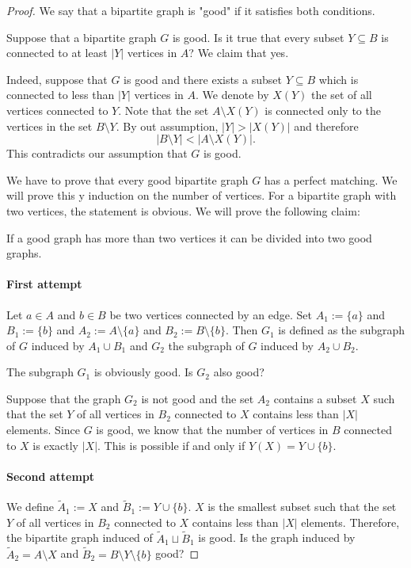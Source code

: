 \begin{proof}
We say that a bipartite graph is "good" if it satisfies both conditions. 

Suppose that a bipartite graph $G$ is good. Is it true that every subset $Y\subseteq B$ is connected to at least $|Y|$ vertices in $A$? We claim that yes.

Indeed, suppose that $G$ is good and there exists a subset $Y\subseteq B$ which is connected to less than $|Y|$ vertices in $A$. We denote by $X(Y)$ the set of all vertices connected to $Y$. Note that the set $A\setminus X(Y)$ is connected only to the vertices in the set $B\setminus Y$. By out assumption, $|Y|>|X(Y)|$ and therefore
$$
|B\setminus Y|<|A\setminus X(Y)|.
$$
This contradicts our assumption that $G$ is good.

We have to prove that every good bipartite graph $G$ has a perfect matching. We will prove this y induction on the number of vertices. For a bipartite graph with two vertices, the statement is obvious. We will prove the following claim:
\begin{claim}\label{claim121}
If a good graph has more than two vertices it can be divided into two good graphs.
\end{claim}
\paragraph{First attempt}
Let $a\in A$ and $b\in B$ be two vertices connected by an edge. Set $A_{1}:=\{ a \}$ and $B_{1}:=\{ b \}$ and $A_{2}:=A\setminus \{ a \}$ and $B_{2}:=B\setminus \{ b \}$. Then $G_{1}$ is defined as the subgraph of $G$ induced by $A_{1}\cup B_{1}$ and $G_{2}$ the subgraph of $G$ induced by $A_{2}\cup B_{2}$. 

The subgraph $G_{1}$ is obviously good. Is $G_{2}$ also good?

Suppose that the graph $G_{2}$ is not good and the set $A_{2}$ contains a subset $X$ such that the set $Y$ of all vertices in $B_{2}$ connected to $X$ contains less than $|X|$ elements. Since $G$ is good, we know that the number of vertices in $B$ connected to $X$ is exactly $|X|$. This is possible if and only if $Y(X)=Y\cup \{ b \}$.

\paragraph{Second attempt}
We define $\tilde{A}_{1}:=X$ and $\tilde{B}_{1}:=Y\cup \{ b \}$. $X$ is the smallest subset such that the set $Y$ of all vertices in $B_{2}$ connected to $X$ contains less than $|X|$ elements. Therefore, the bipartite graph induced of $\tilde{A}_{1}\sqcup \tilde{B}_{1}$ is good. Is the graph induced by $\tilde{A}_{2}=A\setminus X$ and $\tilde{B}_{2}=B\setminus Y\setminus \{ b \}$ good? 


\end{proof}
